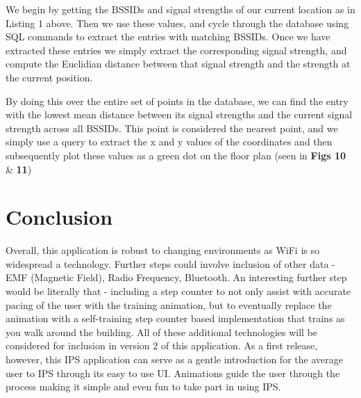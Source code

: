 \documentclass[10.8pt]{article}
\begin{document}
We begin by getting the BSSIDs and signal strengths of our current location as in Listing 1 above. Then we use these values, and cycle through the database using SQL commands to extract the entries with matching BSSIDs. Once we have extracted these entries we simply extract the corresponding signal strength, and compute the Euclidian distance between that signal strength and the strength at the current position. 

By doing this over the entire set of points in the database, we can find the entry with the lowest mean distance between its signal strengths and the current signal strength across all BSSIDs. This point is considered the nearest point, and we simply use a query to extract the x and y values of the coordinates and then subsequently plot these values as a green dot on the floor plan (seen in \textbf{Figs 10} \& \textbf{11})


\section*{Conclusion}

Overall, this application is robust to changing environments as WiFi is so widespread a technology. Further steps could involve inclusion of other data - EMF (Magnetic Field), Radio Frequency, Bluetooth. An interesting further step would be literally that - including a step counter to not only assist with accurate pacing of the user with the training animation, but to eventually replace the animation with a self-training step counter based implementation that trains as you walk around the building. All of these additional technologies will be considered for inclusion in version 2 of this application. As a first release, however, this IPS application can serve as a gentle introduction for the average user to IPS through its easy to use UI. Animations guide the user through the process making it simple and even fun to take part in using IPS.


\vspace{\baselineskip}



\end{document}

